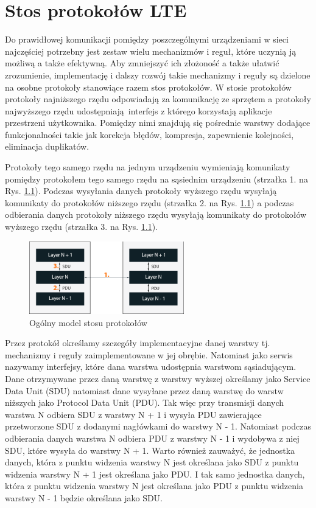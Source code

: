 \chapter{Stos protokołów LTE}
\label{cha:protokoly}

Do prawidłowej komunikacji pomiędzy poszczególnymi urządzeniami w sieci najczęściej potrzebny jest zestaw wielu mechanizmów i reguł, które uczynią ją możliwą a także efektywną. Aby zmniejszyć ich złożoność a także ułatwić zrozumienie, implementację i dalszy rozwój takie mechanizmy i reguły są dzielone na osobne protokoły stanowiące razem stos protokołów. W stosie protokołów protokoły najniższego rzędu odpowiadają za komunikację ze sprzętem a protokoły najwyższego rzędu udostępniają interfejs z którego korzystają aplikacje przestrzeni użytkownika. Pomiędzy nimi znajdują się pośrednie warstwy dodające funkcjonalności takie jak korekcja błędów, kompresja, zapewnienie kolejności, eliminacja duplikatów.

Protokoły tego samego rzędu na jednym urządzeniu wymieniają komunikaty pomiędzy protokołem tego samego rzędu na sąsiednim urządzeniu (strzałka 1. na Rys. \ref{fig:protocols_stack}). Podczas wysyłania danych protokoły wyższego rzędu wysyłają komunikaty do protokołów niższego rzędu (strzałka 2. na Rys. \ref{fig:protocols_stack}) a podczas odbierania danych protokoły niższego rzędu wysyłają komunikaty do protokołów wyższego rzędu (strzałka 3. na Rys. \ref{fig:protocols_stack}). 

\begin{figure}
	\centerline{\includegraphics[width=0.6\textwidth]{images/protocols.png}}
	\caption{Ogólny model stosu protokołów}
	\label{fig:protocols_stack}
\end{figure}

Przez protokół określamy szczegóły implementacyjne danej warstwy tj. mechanizmy i reguły zaimplementowane w jej obrębie. Natomiast jako serwis nazywamy interfejsy, które dana warstwa udostępnia warstwom sąsiadującym. \cite{Ahm13} Dane otrzymywane przez daną warstwę z warstwy wyższej określamy jako Service Data Unit (SDU) natomiast dane wysyłane przez daną warstwę do warstw niższych jako Protocol Data Unit (PDU). 
Tak więc przy transmisji danych warstwa N odbiera SDU z warstwy N + 1 i wysyła PDU zawierające przetworzone SDU z dodanymi nagłówkami do warstwy N - 1. Natomiast podczas odbierania danych warstwa N odbiera PDU z warstwy N - 1 i wydobywa z niej SDU, które wysyła do warstwy N + 1. Warto również zauważyć, że jednostka danych, która z punktu widzenia warstwy N jest określana jako SDU z punktu widzenia warstwy N + 1 jest określana jako PDU. I tak samo jednostka danych, która z punktu widzenia warstwy N jest określana jako PDU z punktu widzenia warstwy N - 1 będzie określana jako SDU.

